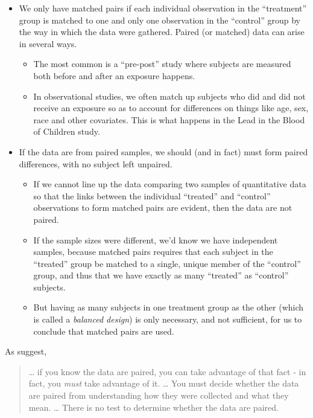 \documentclass[
]{book}
\providecommand{\tightlist}{%
  \setlength{\itemsep}{0pt}\setlength{\parskip}{0pt}}
\begin{document}
\begin{itemize}
\tightlist
\item
  We only have matched pairs if each individual observation in the ``treatment'' group is matched to one and only one observation in the ``control'' group by the way in which the data were gathered. Paired (or matched) data can arise in several ways.

  \begin{itemize}
  \tightlist
  \item
    The most common is a ``pre-post'' study where subjects are measured both before and after an exposure happens.
  \item
    In observational studies, we often match up subjects who did and did not receive an exposure so as to account for differences on things like age, sex, race and other covariates. This is what happens in the Lead in the Blood of Children study.
  \end{itemize}
\item
  If the data are from paired samples, we should (and in fact) must form paired differences, with no subject left unpaired.

  \begin{itemize}
  \tightlist
  \item
    If we cannot line up the data comparing two samples of quantitative data so that the links between the individual ``treated'' and ``control'' observations to form matched pairs are evident, then the data are not paired.
  \item
    If the sample sizes were different, we'd know we have independent samples, because matched pairs requires that each subject in the ``treated'' group be matched to a single, unique member of the ``control'' group, and thus that we have exactly as many ``treated'' as ``control'' subjects.
  \item
    But having as many subjects in one treatment group as the other (which is called a \emph{balanced design}) is only necessary, and not sufficient, for us to conclude that matched pairs are used.
  \end{itemize}
\end{itemize}

As \citet{BockVD} suggest,

\begin{quote}
\ldots{} if you know the data are paired, you can take advantage of that fact - in fact, you \emph{must} take advantage of it. \ldots{} You must decide whether the data are paired from understanding how they were collected and what they mean. \ldots{} There is no test to determine whether the data are paired.
\end{quote}
\end{document}
